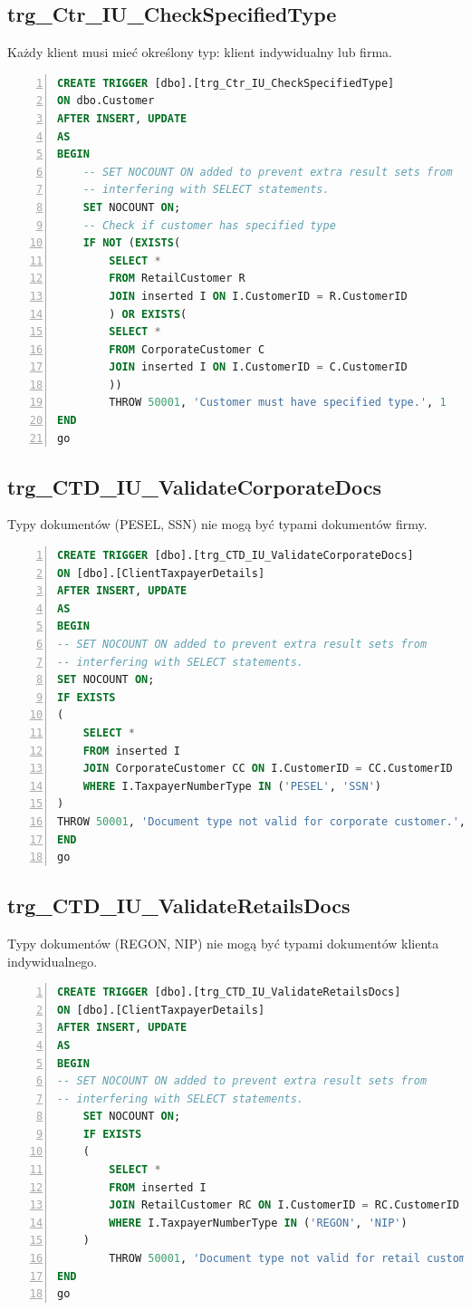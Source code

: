 \documentclass[]{article}
\begin{document}
	\subsection{trg\_Ctr\_IU\_CheckSpecifiedType}
Każdy klient musi mieć określony typ: klient indywidualny lub firma.
\begin{lstlisting}[language=SQL,
showspaces=false,
basicstyle=\ttfamily,
numbers=left,
numberstyle=\tiny,
tabsize=2,
backgroundcolor=\color{lightg},
keywordstyle=\color{lightblue},
commentstyle=\color{gray}]
CREATE TRIGGER [dbo].[trg_Ctr_IU_CheckSpecifiedType]
ON dbo.Customer
AFTER INSERT, UPDATE
AS
BEGIN
	-- SET NOCOUNT ON added to prevent extra result sets from
	-- interfering with SELECT statements.
	SET NOCOUNT ON;
	-- Check if customer has specified type
	IF NOT (EXISTS(
		SELECT *
		FROM RetailCustomer R
		JOIN inserted I ON I.CustomerID = R.CustomerID
		) OR EXISTS(
		SELECT *
		FROM CorporateCustomer C
		JOIN inserted I ON I.CustomerID = C.CustomerID
		))
		THROW 50001, 'Customer must have specified type.', 1
END
go

\end{lstlisting}

	\subsection{trg\_CTD\_IU\_ValidateCorporateDocs}
Typy dokumentów (PESEL, SSN) nie mogą być typami dokumentów firmy.
\begin{lstlisting}[language=SQL,
showspaces=false,
basicstyle=\ttfamily,
numbers=left,
numberstyle=\tiny,
tabsize=2,
backgroundcolor=\color{lightg},
keywordstyle=\color{lightblue},
commentstyle=\color{gray}]
CREATE TRIGGER [dbo].[trg_CTD_IU_ValidateCorporateDocs]
ON [dbo].[ClientTaxpayerDetails]
AFTER INSERT, UPDATE
AS
BEGIN
-- SET NOCOUNT ON added to prevent extra result sets from
-- interfering with SELECT statements.
SET NOCOUNT ON;
IF EXISTS
(
	SELECT *
	FROM inserted I
	JOIN CorporateCustomer CC ON I.CustomerID = CC.CustomerID
	WHERE I.TaxpayerNumberType IN ('PESEL', 'SSN')
)
THROW 50001, 'Document type not valid for corporate customer.', 1
END
go
\end{lstlisting}

	\subsection{trg\_CTD\_IU\_ValidateRetailsDocs}
Typy dokumentów (REGON, NIP) nie mogą być typami dokumentów klienta indywidualnego.
\begin{lstlisting}[language=SQL,
showspaces=false,
basicstyle=\ttfamily,
numbers=left,
numberstyle=\tiny,
tabsize=2,
backgroundcolor=\color{lightg},
keywordstyle=\color{lightblue},
commentstyle=\color{gray}]
CREATE TRIGGER [dbo].[trg_CTD_IU_ValidateRetailsDocs]
ON [dbo].[ClientTaxpayerDetails]
AFTER INSERT, UPDATE
AS
BEGIN
-- SET NOCOUNT ON added to prevent extra result sets from
-- interfering with SELECT statements.
	SET NOCOUNT ON;
	IF EXISTS
	(
		SELECT *
		FROM inserted I
		JOIN RetailCustomer RC ON I.CustomerID = RC.CustomerID
		WHERE I.TaxpayerNumberType IN ('REGON', 'NIP')
	)
		THROW 50001, 'Document type not valid for retail customer.', 1
END
go
\end{lstlisting}
\end{document}
